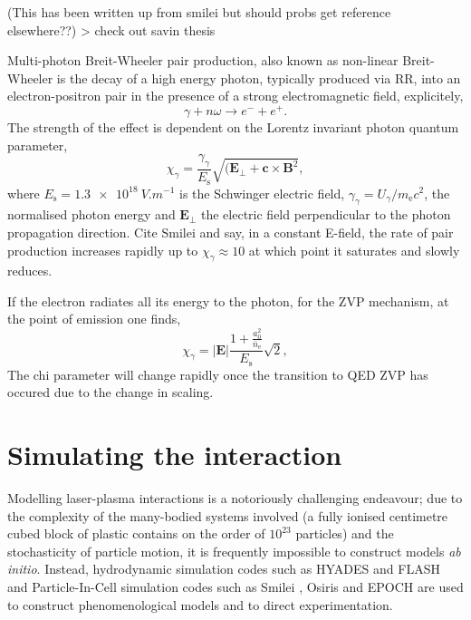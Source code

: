 (This has been written up from smilei but should probs get reference elsewhere??) > check out savin thesis

Multi-photon Breit-Wheeler pair production, also known as non-linear Breit-Wheeler is the decay of a high energy photon, typically produced via \ac{RR}, into an electron-positron pair in the presence of a strong electromagnetic field, explicitely,
\begin{equation}
	\gamma + n\omega \to e^- + e^+.
\end{equation}
The strength of the effect is dependent on the Lorentz invariant photon quantum parameter,
\begin{equation}
	\chi_\gamma = \frac{\gamma_\gamma}{E_\mathrm{s}} \sqrt{(\mathbf{E}_\perp + \mathbf{c}\times \mathbf{B}^2},
\end{equation}
where $E_\mathrm{s} = \qty{1.3e18}{V.m^{-1}}$ is the Schwinger electric field, $\gamma_\gamma = U_\gamma /m_\mathrm{e}c^2$, the normalised photon energy and $\mathbf{E}_\perp$ the electric field perpendicular to the photon propagation direction. Cite Smilei and say, in a constant E-field, the rate of pair production increases rapidly up to $\chi_\gamma \approx 10$ at which point it saturates and slowly reduces.


If the electron radiates all its energy to the photon, for the ZVP mechanism, at the point of emission one finds,
\begin{equation}
	\chi_\gamma = |\mathbf{E}|\frac{1 + \frac{a^2_0}{\bar{n}_\mathrm{e}}}{E_\mathrm{s}} \sqrt{2},
\end{equation}
The chi parameter will change rapidly once the transition to QED ZVP has occured due to the change in scaling.


\section{Simulating the interaction}
Modelling laser-plasma interactions is a notoriously challenging endeavour; due to the complexity of the many-bodied systems involved (a fully ionised centimetre cubed block of plastic contains on the order of $10^23$ particles) and the stochasticity of particle motion, it is frequently impossible to construct models \textit{ab initio}. Instead, hydrodynamic simulation codes such as HYADES \cite{larsenHYADESPlasmaHydrodynamics1994} and FLASH \cite{fryxellFLASHAdaptiveMesh2000} and Particle-In-Cell simulation codes such as Smilei \cite{derouillatSmileiCollaborativeOpensource2018}, Osiris \cite{fonsecaOSIRISThreeDimensionalFully2002} and EPOCH \cite{bennett2017users} are used to construct phenomenological models and to direct experimentation. 


